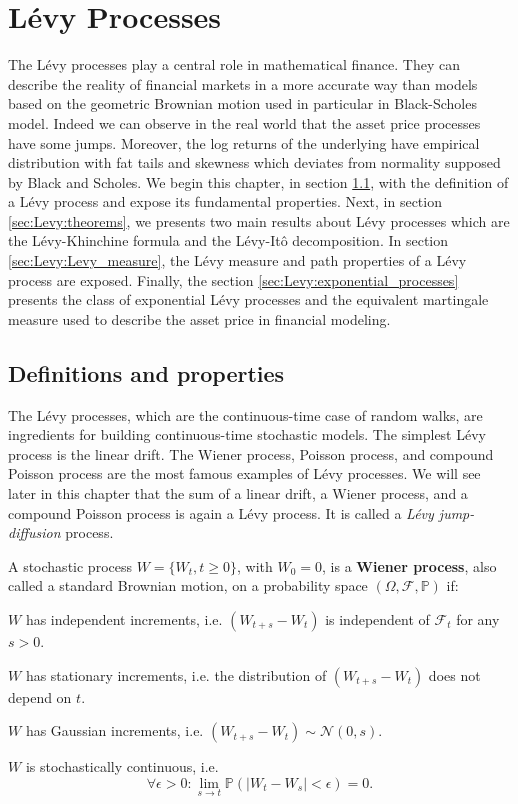 \chapter{L\'evy Processes}
\label{sec:Levy}


The L\'evy processes play a central role in mathematical finance. They can describe the reality of financial markets in a more accurate way than models based on the geometric Brownian motion used in particular in Black-Scholes model. Indeed we can observe in the real world that the asset price processes have some jumps. Moreover, the log returns of the underlying have empirical distribution with fat tails and skewness which deviates from normality supposed by Black and Scholes. We begin this chapter, in section \ref{sec:Levy:definitions}, with the definition of a L\'evy process and expose its fundamental properties. Next, in section \ref{sec:Levy:theorems}, we presents two main results about L\'evy processes which are the L\'evy-Khinchine formula and the L\'evy-Itô decomposition. In section \ref{sec:Levy:Levy_measure}, the L\'evy measure and  path properties of a L\'evy process are exposed. Finally, the section \ref{sec:Levy:exponential_processes} presents the class of exponential L\'evy processes and the equivalent martingale measure used to describe the asset price in financial modeling.

\section{Definitions and properties}
\label{sec:Levy:definitions}
The L\'evy processes, which are the continuous-time case of random walks, are ingredients for building continuous-time stochastic models. The simplest L\'evy process is the linear drift. The Wiener process, Poisson process, and compound Poisson process are the most famous examples of L\'evy processes. We will see later in this chapter that the sum of a linear drift, a Wiener process, and a compound Poisson process is again a L\'evy process. It is called a \textit{L\'evy jump-diffusion} process.

\begin{defn}\label{def:wiener}
A stochastic process $W = \{W_t,t\geq 0\}$, with $W_0=0$, is a \textbf{Wiener process}, also called a standard Brownian motion, on a probability space $(\Omega,\mathcal{F},\mathbb{P})$ if:
\begin{my_list_num}
\item $W$ has independent increments, i.e. $(W_{t+s}-W_t)$ is independent of $\mathcal{F}_t$ for any $s>0$.
\item $W$ has stationary increments, i.e. the distribution of $(W_{t+s}-W_t)$ does not depend on $t$.
\item $W$ has Gaussian increments, i.e. $(W_{t+s}-W_t) \sim \mathcal{N}(0,s)$.
\item $W$ is stochastically continuous, i.e. $$\forall \epsilon>0: \lim_{s \to t}\mathbb{P}(|W_t-W_s|<\epsilon)=0.$$
\end{my_list_num}
\end{defn}


